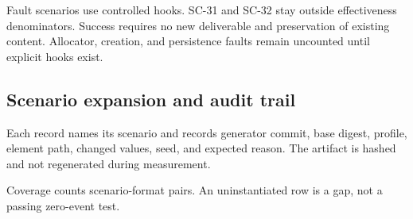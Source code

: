 Fault scenarios use controlled hooks. SC-31 and SC-32 stay outside effectiveness
denominators. Success requires no new deliverable and preservation of existing
content. Allocator, creation, and persistence faults remain uncounted until
explicit hooks exist.

\subsection{Scenario expansion and audit trail}
\label{subsec:scenario-expansion}

Each record names its scenario and records generator commit, base digest,
profile, element path, changed values, seed, and expected reason. The artifact
is hashed and not regenerated during measurement.

Coverage counts scenario-format pairs. An uninstantiated row is a gap, not a
passing zero-event test.
